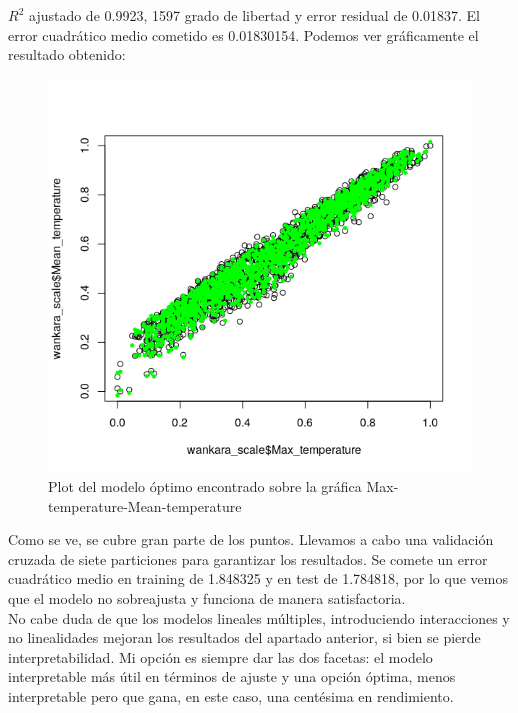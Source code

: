 $R^2$ ajustado de 0.9923, 1597 grado de libertad y error residual de 0.01837. El error cuadrático medio cometido es 0.01830154. Podemos ver gráficamente el resultado obtenido:

\begin{figure}[H] %
	\centering
	\includegraphics[scale=0.5]{plot-opt.png}  %
	\caption{Plot del modelo óptimo encontrado sobre la gráfica Max-temperature-Mean-temperature} 
	\label{fig:plot-opt}
\end{figure}

Como se ve, se cubre gran parte de los puntos. Llevamos a cabo una validación cruzada de siete particiones para garantizar los resultados. Se comete un error cuadrático medio en training de  1.848325 y en test de 1.784818, por lo que vemos que el modelo no sobreajusta y funciona de manera satisfactoria. \\

No cabe duda de que los modelos lineales múltiples, introduciendo interacciones y no linealidades mejoran los resultados del apartado anterior, si bien se pierde interpretabilidad. Mi opción es siempre dar las dos facetas: el modelo interpretable más útil en términos de ajuste y una opción óptima, menos interpretable pero que gana, en este caso, una centésima en rendimiento. 

